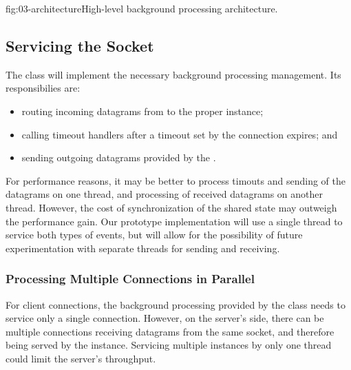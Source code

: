 \begin{myFigure}{fig:03-architecture}{High-level background processing architecture.}

  

\end{myFigure}

\subsection{Servicing the Socket}

The \QuicSocketContext{} class will implement the necessary background processing management. Its
responsibilies are:

\begin{itemize}

  \item routing incoming datagrams from \Socket{} to the proper \QuicConnection{}
  instance;

  \item calling timeout handlers after a timeout set by the connection expires; and

  \item sending outgoing datagrams provided by the \QuicConnection{}.

\end{itemize}

For performance reasons, it may be better to process timouts and sending of the datagrams on one
thread, and processing of received datagrams on another thread. However, the cost of synchronization
of the shared state may outweigh the performance gain. Our prototype implementation will use a
single thread to service both types of events, but will allow for the possibility of future
experimentation with separate threads for sending and receiving.

\subsubsection{Processing Multiple Connections in Parallel}

For client connections, the background processing provided by the \QuicSocketContext{} class needs
to service only a single connection. However, on the server's side, there can be multiple
connections receiving datagrams from the same socket, and therefore being served by the
\QuicSocketContext{} instance. Servicing multiple \QuicConnection{} instances by only one thread
could limit the server's throughput.

